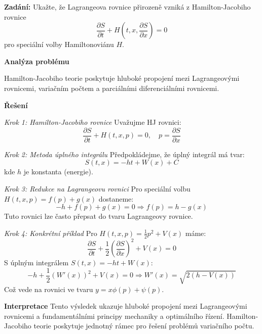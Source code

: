 \begin{example}
\label{ex:hamilton-jacobi-lagrange}

\noindent\textbf{Zadání:} Ukažte, že Lagrangeova rovnice přirozeně vzniká z Hamilton-Jacobiho rovnice
\[
\frac{\partial S}{\partial t} + H\left(t, x, \frac{\partial S}{\partial x}\right) = 0
\]
pro speciální volby Hamiltonoviánu $H$.

\vspace{1.5\baselineskip}

\noindent\textbf{Analýza problému}

Hamilton-Jacobiho teorie poskytuje hluboké propojení mezi Lagrangeovými rovnicemi, variačním počtem a parciálními diferenciálními rovnicemi.

\vspace{1.5\baselineskip}

\noindent\textbf{Řešení}

\noindent\textit{Krok 1: Hamilton-Jacobiho rovnice}
Uvažujme HJ rovnici:
\[
\frac{\partial S}{\partial t} + H(t, x, p) = 0, \quad p = \frac{\partial S}{\partial x}
\]

\vspace{1\baselineskip}

\noindent\textit{Krok 2: Metoda úplného integrálu}
Předpokládejme, že úplný integrál má tvar:
\[
S(t, x) = -ht + W(x) + C
\]
kde $h$ je konstanta (energie).

\vspace{1\baselineskip}

\noindent\textit{Krok 3: Redukce na Lagrangeovu rovnici}
Pro speciální volbu $H(t, x, p) = f(p) + g(x)$ dostaneme:
\[
-h + f(p) + g(x) = 0 \Rightarrow f(p) = h - g(x)
\]
Tuto rovnici lze často přepsat do tvaru Lagrangeovy rovnice.

\vspace{1\baselineskip}

\noindent\textit{Krok 4: Konkrétní příklad}
Pro $H(t, x, p) = \frac{1}{2}p^2 + V(x)$ máme:
\[
\frac{\partial S}{\partial t} + \frac{1}{2}\left(\frac{\partial S}{\partial x}\right)^2 + V(x) = 0
\]
S úplným integrálem $S(t, x) = -ht + W(x)$:
\[
-h + \frac{1}{2}(W'(x))^2 + V(x) = 0 \Rightarrow W'(x) = \sqrt{2(h - V(x))}
\]
Což vede na rovnici ve tvaru $y = x\phi(p) + \psi(p)$.

\vspace{1.5\baselineskip}

\noindent\textbf{Interpretace}
Tento výsledek ukazuje hluboké propojení mezi Lagrangeovými rovnicemi a fundamentálními principy mechaniky a optimálního řízení. Hamilton-Jacobiho teorie poskytuje jednotný rámec pro řešení problémů variačního počtu.
\end{example}

